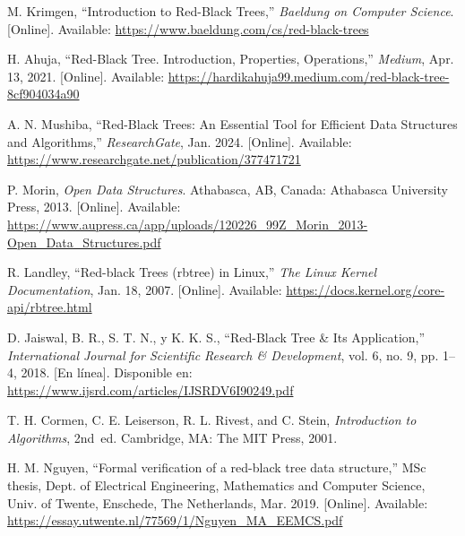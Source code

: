 \documentclass[conference]{IEEEtran}
\begin{document}








\begin{thebibliography}{00}

    M. Krimgen, ``Introduction to Red-Black Trees,'' \textit{Baeldung on Computer Science}. [Online]. Available: \url{https://www.baeldung.com/cs/red-black-trees}

    H. Ahuja, ``Red-Black Tree. Introduction, Properties, Operations,'' \textit{Medium}, Apr. 13, 2021. [Online]. Available: \url{https://hardikahuja99.medium.com/red-black-tree-8cf904034a90}

    A. N. Mushiba, ``Red-Black Trees: An Essential Tool for Efficient Data Structures and Algorithms,'' \textit{ResearchGate}, Jan. 2024. [Online]. Available: \url{https://www.researchgate.net/publication/377471721}

    P. Morin, \textit{Open Data Structures}. Athabasca, AB, Canada: Athabasca University Press, 2013. [Online]. Available: \url{https://www.aupress.ca/app/uploads/120226_99Z_Morin_2013-Open_Data_Structures.pdf}

    R. Landley, ``Red-black Trees (rbtree) in Linux,'' \textit{The Linux Kernel Documentation}, Jan. 18, 2007. [Online]. Available: \url{https://docs.kernel.org/core-api/rbtree.html}
    
    D. Jaiswal, B. R., S. T. N., y K. K. S., ``Red-Black Tree \& Its Application,'' \textit{International Journal for Scientific Research \& Development}, vol. 6, no. 9, pp. 1–4, 2018. [En línea]. Disponible en: \url{https://www.ijsrd.com/articles/IJSRDV6I90249.pdf}

    T. H. Cormen, C. E. Leiserson, R. L. Rivest, and C. Stein, \textit{Introduction to Algorithms}, 2nd~ed. Cambridge, MA: The MIT Press, 2001.

    H. M. Nguyen, ``Formal verification of a red-black tree data structure,'' MSc thesis, Dept. of Electrical Engineering, Mathematics and Computer Science, Univ. of Twente, Enschede, The Netherlands, Mar. 2019. [Online]. Available: \url{https://essay.utwente.nl/77569/1/Nguyen_MA_EEMCS.pdf}
    

\end{thebibliography}
\end{document}
